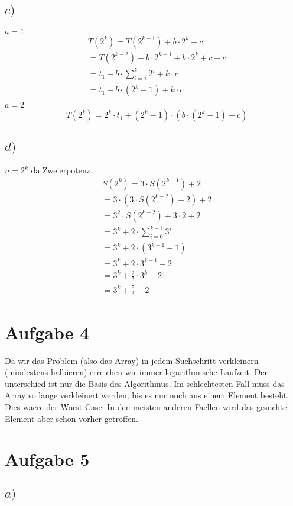 \documentclass[a4paper]{scrartcl}
\begin{document}
\subsection*{$c)$}
$a=1$
\begin{align}
	&T(2^k) = T(2^{k-1}) + b \cdot 2^k +c\\
	&=T(2^{k-2}) + b\cdot 2^{k-1} +b \cdot 2^k + c +c\\
	&=t_1 + b \cdot \sum_{i=1}^{k}2^i + k \cdot c\\
	&=t_1 + b \cdot (2^k -1) + k \cdot c\\
\end{align}
$a=2$
\begin{align}
	&T(2^k) = 2^k \cdot t_1 + (2^k -1) \cdot (b \cdot (2^k -1) +c)
\end{align}

\subsection*{$d)$}
$n = 2^k$ da Zweierpotenz.
\begin{align}
	&S(2^k) = 3 \cdot S(2^{k-1}) +2\\
	&= 3\cdot (3\cdot S(2^{k-2}) +2) +2\\
	&= 3^2 \cdot S(2^{k-2}) + 3 \cdot 2 +2\\
	&= 3^k + 2 \cdot \sum_{i = 0}^{k-1} 3^i\\
	&= 3^k + 2\cdot (3^{k-1} - 1)\\
	&= 3^k + 2 \cdot 3^{k-1} - 2\\
	&= 3^k + \frac{2}{3} \cdot3^k -2\\
	&= 3^k + \frac{5}{3} -2
\end{align}


\section*{Aufgabe 4}
Da wir das Problem (also das Array) in jedem Suchschritt verkleinern (mindestens halbieren) erreichen wir immer logarithmische Laufzeit. Der unterschied ist nur die Basis des Algorithmus. Im schlechtesten Fall muss das Array so lange verkleinert werden, bis es nur noch aus einem Element besteht. Dies waere der Worst Case. In den meisten anderen Faellen wird das gesuchte Element aber schon vorher getroffen.

\section*{Aufgabe 5}
\subsection*{$a)$}
\end{document}
